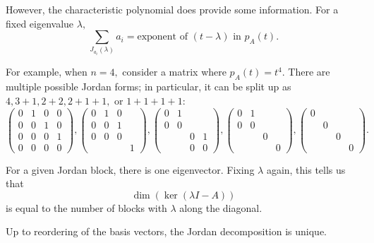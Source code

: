 However, the characteristic polynomial does provide some information. For a fixed eigenvalue $\lambda,$ 
\[
\sum_{J_{a_i}(\lambda)} a_i = \text{exponent of } (t-\lambda) \text{ in } p_A(t).
\]

\begin{example}[$n = 4$]
For example, when $n = 4,$ consider a matrix where $p_A(t) = t^4.$ There are multiple possible Jordan forms; in particular, it can be split up as $4, 3 + 1, 2 + 2, 2 + 1 + 1,$ or $1 + 1 + 1 + 1:$
\[
\begin{pmatrix}
0 & 1 & 0 & 0 \\
0 & 0 & 1 & 0 \\
0 & 0 & 0 & 1 \\
0 & 0 & 0 & 0
\end{pmatrix},
\begin{pmatrix}
0 & 1 & 0 &  \\
0 & 0 & 1 &  \\
0 & 0 & 0 &  \\
 &  &  & 1
\end{pmatrix},
\begin{pmatrix}
0 & 1 &  &  \\
0 & 0 &  &  \\
 &  & 0 & 1 \\
 &  & 0 & 0 
\end{pmatrix},
\begin{pmatrix}
0 & 1 &  &  \\
0 & 0 &  &  \\
 &  & 0 &  \\
 &  &  &  0
\end{pmatrix},
\begin{pmatrix}
0 &  &  &  \\
 & 0 &  &  \\
 &  & 0 &  \\
 &  &  & 0
\end{pmatrix}.
\]
\end{example}

For a given Jordan block, there is one eigenvector. Fixing $\lambda$ again, this tells us that 
\[
\dim(\ker(\lambda I - A))
\]
is equal to the number of blocks with $\lambda$ along the diagonal.


Up to reordering of the basis vectors, the Jordan decomposition is unique. 

